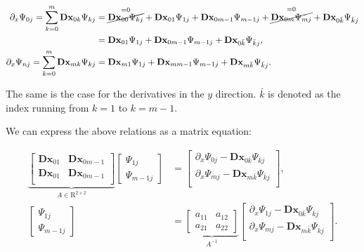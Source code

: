 \begin{align}
\partial_x \Psi_{0j} = \sum_{k=0}^{m} \mathbf{Dx}_{0k} \Psi_{kj}
  &= \overset{=0}{\cancel{\mathbf{Dx}_{00}\Psi_{kj}}} + \mathbf{Dx}_{01}\Psi_{1j} 
  + \mathbf{Dx}_{0m-1}\Psi_{m-1j} +  \overset{=0}{\cancel{\mathbf{Dx}_{0m}\Psi_{mj}}}
  + \mathbf{Dx}_{0\bar{k}}\Psi_{\bar{k}j} \nonumber \\
  &= \mathbf{Dx}_{01}\Psi_{1j} + \mathbf{Dx}_{0m-1}\Psi_{m-1j}
  + \mathbf{Dx}_{0\bar{k}}\Psi_{\bar{k}j}, \\
\partial_x \Psi_{nj} = \sum_{k=0}^{m} \mathbf{Dx}_{mk} \Psi_{kj}
  &= \mathbf{Dx}_{m1}\Psi_{1j} + \mathbf{Dx}_{mm-1}\Psi_{m-1j} 
  + \mathbf{Dx}_{m\bar{k}}\Psi_{\bar{k}j}.
\end{align}

The same is the case for the derivatives in the $y$ direction. $\bar{k}$ is
denoted as the index running from $k=1$ to $k=m-1$.

We can express the above relations as a matrix equation:

\begin{align}
\underbrace{\begin{bmatrix} \mathbf{Dx}_{01} & \mathbf{Dx}_{0m-1} \\
  \mathbf{Dx}_{01} & \mathbf{Dx}_{0m-1} \\
\end{bmatrix}}_{A \in \mathrm{R}^{2 \times 2}}
\begin{bmatrix} \Psi_{1j} \\ \Psi_{m-1j}
\end{bmatrix} &=
\begin{bmatrix}
\partial_x\Psi_{0j} - \mathbf{Dx}_{0\bar{k}}\Psi_{\bar{k}j} \\
\partial_x\Psi_{mj} - \mathbf{Dx}_{m\bar{k}}\Psi_{\bar{k}j} \\
\end{bmatrix}, \nonumber \\
\begin{bmatrix} \Psi_{1j} \\ \Psi_{m-1j}
\end{bmatrix} &=
\underbrace{\begin{bmatrix} a_{11} & a_{12} \\ a_{21} & a_{22} 
\end{bmatrix}}_{A^{-1}}
\begin{bmatrix}
\partial_x\Psi_{1j} - \mathbf{Dx}_{0\bar{k}}\Psi_{\bar{k}j} \\
\partial_x\Psi_{mj} - \mathbf{Dx}_{m\bar{k}}\Psi_{\bar{k}j} \\
\end{bmatrix}.
\end{align}

